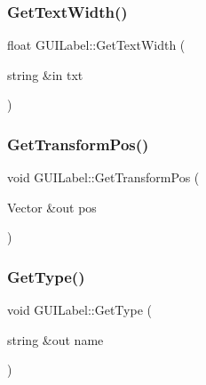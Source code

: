 \hypertarget{class_g_u_i_label_a79b4350dbb50af2012fcf56654e94ce7}{}\label{class_g_u_i_label_a79b4350dbb50af2012fcf56654e94ce7} 
\subsubsection{\texorpdfstring{Get\+Text\+Width()}{GetTextWidth()}}
{\footnotesize\ttfamily float G\+U\+I\+Label\+::\+Get\+Text\+Width (\begin{DoxyParamCaption}\item[{string \&in}]{txt }\end{DoxyParamCaption})}

\hypertarget{class_g_u_i_label_a5ad13a72ed2bb5497ffee3929adf729f}{}\label{class_g_u_i_label_a5ad13a72ed2bb5497ffee3929adf729f} 
\subsubsection{\texorpdfstring{Get\+Transform\+Pos()}{GetTransformPos()}}
{\footnotesize\ttfamily void G\+U\+I\+Label\+::\+Get\+Transform\+Pos (\begin{DoxyParamCaption}\item[{Vector \&out}]{pos }\end{DoxyParamCaption})}

\hypertarget{class_g_u_i_label_a2ab9799d33d6ce75584438afe73b181a}{}\label{class_g_u_i_label_a2ab9799d33d6ce75584438afe73b181a} 
\subsubsection{\texorpdfstring{Get\+Type()}{GetType()}}
{\footnotesize\ttfamily void G\+U\+I\+Label\+::\+Get\+Type (\begin{DoxyParamCaption}\item[{string \&out}]{name }\end{DoxyParamCaption})}

\hypertarget{class_g_u_i_label_a5bde8f8930ba45e5fdc916ebd81b6d9d}{}\label{class_g_u_i_label_a5bde8f8930ba45e5fdc916ebd81b6d9d} 
